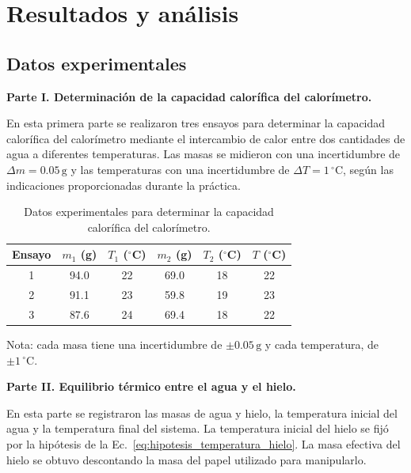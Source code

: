 \section{Resultados y análisis}
\label{sec:resultados_analisis}

\subsection{Datos experimentales}
\label{subsec:datos_experimentales}

\textbf{Parte I. Determinación de la capacidad calorífica del calorímetro.}

En esta primera parte se realizaron tres ensayos para determinar la capacidad calorífica del calorímetro mediante el intercambio de calor entre dos cantidades de agua a diferentes temperaturas. Las masas se midieron con una incertidumbre de $\Delta m=0.05\,\mathrm{g}$ y las temperaturas con una incertidumbre de $\Delta T=1\,^\circ\mathrm{C}$, según las indicaciones proporcionadas durante la práctica.

\begin{table}[H]
    \centering
    \caption{Datos experimentales para determinar la capacidad calorífica del calorímetro.}
    \label{tab:datos_capacidad}
    \begin{tabular}{cccccc}
        \toprule
        Ensayo & $m_1$ (g) & $T_1$ ($^\circ$C) &
        $m_2$ (g) & $T_2$ ($^\circ$C) & $T$ ($^\circ$C) \\
        \midrule
        1 & 94.0 & 22 & 69.0 & 18 & 22 \\
        2 & 91.1 & 23 & 59.8 & 19 & 23 \\
        3 & 87.6 & 24 & 69.4 & 18 & 22 \\
        \bottomrule
    \end{tabular}

    \vspace{2mm}
    \footnotesize
    Nota: cada masa tiene una incertidumbre de $\pm 0.05\,\mathrm{g}$ y cada temperatura, de $\pm 1\,^\circ\mathrm{C}$.
\end{table}

\textbf{Parte II. Equilibrio térmico entre el agua y el hielo.}

En esta parte se registraron las masas de agua y hielo, la temperatura inicial del agua y la temperatura final del sistema. La temperatura inicial del hielo se fijó por la hipótesis de la Ec.~\eqref{eq:hipotesis_temperatura_hielo}. La masa efectiva del hielo se obtuvo descontando la masa del papel utilizado para manipularlo.

